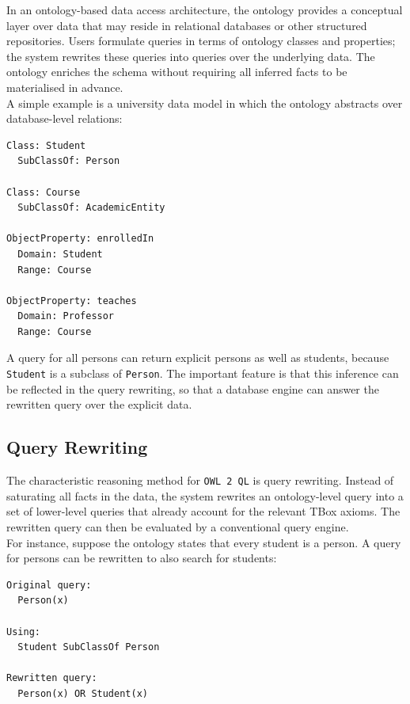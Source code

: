 \documentclass{scrbook}
\begin{document}
	In an ontology-based data access architecture, the ontology provides a conceptual layer over data that may reside in relational databases or other structured repositories. Users formulate queries in terms of ontology classes and properties; the system rewrites these queries into queries over the underlying data. The ontology enriches the schema without requiring all inferred facts to be materialised in advance.\\
	
	A simple example is a university data model in which the ontology abstracts over database-level relations:
	\begin{lstlisting}
Class: Student
  SubClassOf: Person

Class: Course
  SubClassOf: AcademicEntity

ObjectProperty: enrolledIn
  Domain: Student
  Range: Course

ObjectProperty: teaches
  Domain: Professor
  Range: Course
	\end{lstlisting}
	
	A query for all persons can return explicit persons as well as students, because \texttt{Student} is a subclass of \texttt{Person}. The important feature is that this inference can be reflected in the query rewriting, so that a database engine can answer the rewritten query over the explicit data.
	
	\subsection{Query Rewriting}
	
	The characteristic reasoning method for \texttt{OWL 2 QL} is query rewriting. Instead of saturating all facts in the data, the system rewrites an ontology-level query into a set of lower-level queries that already account for the relevant TBox axioms. The rewritten query can then be evaluated by a conventional query engine.\\
	
	For instance, suppose the ontology states that every student is a person. A query for persons can be rewritten to also search for students:
	
	\begin{lstlisting}
Original query:
  Person(x)

Using:
  Student SubClassOf Person

Rewritten query:
  Person(x) OR Student(x)
	\end{lstlisting}
	
\end{document}
